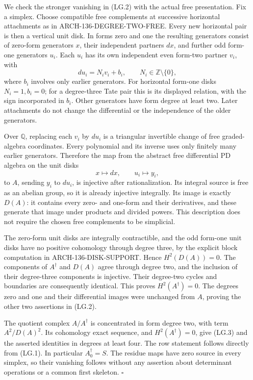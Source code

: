 We check the stronger vanishing in (LG.2) with the actual free
presentation. Fix a simplex. Choose compatible free complements
at successive horizontal attachments as in
ARCH-136-DEGREE-TWO-FREE. Every new horizontal pair is then a
vertical unit disk. In forms zero and one the resulting generators
consist of zero-form generators \(x\), their independent partners
\(dx\), and further odd form-one generators \(u_i\). Each \(u_i\)
has its own independent even form-two partner \(v_i\), with
\[
                  du_i=N_i v_i+b_i,
                  \qquad N_i\in\mathbb Z\setminus\{0\},
 \tag{LG.4}
\]
where \(b_i\) involves only earlier generators. For horizontal
form-one disks \(N_i=1,b_i=0\); for a degree-three Tate pair this
is its displayed relation, with the sign incorporated in \(b_i\).
Other generators have form degree at least two. Later attachments
do not change the differential or the independence of the older
generators.

Over \(\mathbb Q\), replacing each \(v_i\) by \(du_i\) is a
triangular invertible change of free graded-algebra coordinates.
Every polynomial and its inverse uses only finitely many earlier
generators. Therefore the map from the abstract free differential
PD algebra on the unit disks
\[
       x\longmapsto dx,\qquad u_i\longmapsto y_i,
 \tag{LG.5}
\]
to \(A\), sending \(y_i\) to \(du_i\), is injective after
rationalization. Its integral source is free as an abelian group,
so it is already injective integrally. Its image is exactly
\(D(A)\): it contains every zero- and one-form and their
derivatives, and these generate that image under products and
divided powers. This description does not require the chosen free
complements to be simplicial.

The zero-form unit disks are integrally contractible, and the odd
form-one unit disks have no positive cohomology through degree
three, by the explicit block computation in
ARCH-136-DISK-SUPPORT. Hence \(H^2(D(A))=0\). The components of
\(A^\dagger\) and \(D(A)\) agree through degree two, and the
inclusion of their degree-three components is injective. Their
degree-two cycles and boundaries are consequently identical.
This proves \(H^2(A^\dagger)=0\). The degrees zero and one and
their differential images were unchanged from \(A\), proving
the other two assertions in (LG.2).

The quotient complex \(A/A^\dagger\) is concentrated in form
degree two, with term \(A^2/D(A)^2\). Its cohomology exact
sequence, and \(H^2(A^\dagger)=0\), give (LG.3) and the
asserted identities in degrees at least four. The row statement
follows directly from (LG.1). In particular \(A^\dagger_0=S\).
The residue maps have zero source in every simplex, so their
vanishing follows without any assertion about determinant
operations or a common first skeleton. \(\square\)

